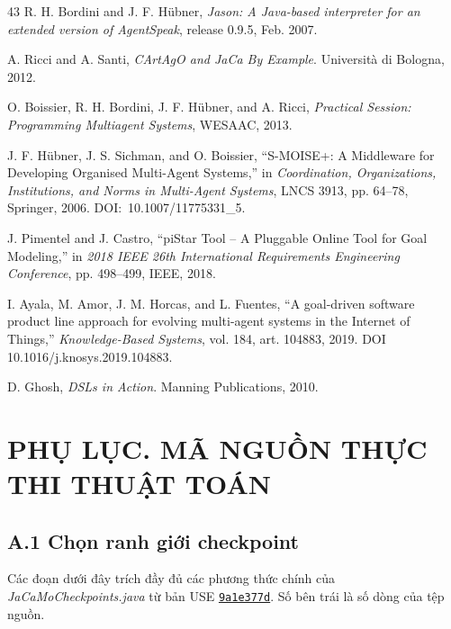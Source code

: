 \documentclass[12pt,a4paper,oneside]{extreport}
\begin{document}
\begin{thebibliography}{43}
R. H. Bordini and J. F. Hübner, \emph{Jason: A Java-based interpreter for an extended version of AgentSpeak}, release 0.9.5, Feb. 2007.


A. Ricci and A. Santi, \emph{CArtAgO and JaCa By Example}. Università di Bologna, 2012.


O. Boissier, R. H. Bordini, J. F. Hübner, and A. Ricci, \emph{Practical Session: Programming Multiagent Systems}, WESAAC, 2013.


J. F. Hübner, J. S. Sichman, and O. Boissier, ``S-MOISE+: A Middleware for Developing Organised Multi-Agent Systems,'' in \emph{Coordination, Organizations, Institutions, and Norms in Multi-Agent Systems}, LNCS 3913, pp. 64--78, Springer, 2006. \mbox{DOI: 10.1007/11775331\_5}.


J. Pimentel and J. Castro, ``piStar Tool -- A Pluggable Online Tool for Goal Modeling,'' in \emph{2018 IEEE 26th International Requirements Engineering Conference}, pp. 498--499, IEEE, 2018.


I. Ayala, M. Amor, J. M. Horcas, and L. Fuentes, ``A goal-driven software product line approach for evolving multi-agent systems in the Internet of Things,'' \emph{Knowledge-Based Systems}, vol. 184, art. 104883, 2019. DOI 10.1016/j.knosys.2019.104883.


D. Ghosh, \emph{DSLs in Action}. Manning Publications, 2010.

\end{thebibliography}

\chapter*{PHỤ LỤC. MÃ NGUỒN THỰC THI THUẬT TOÁN}

\section*{A.1 Chọn ranh giới checkpoint}
\label{app:checkpoint-source}

Các đoạn dưới đây trích đầy đủ các phương thức chính của \textit{JaCaMoCheckpoints.java} từ bản USE \href{https://github.com/nguyentrungnghia1802/use/tree/9a1e377d9802587abe4299a4247ce03f943473a6}{\texttt{9a1e377d}}. Số bên trái là số dòng của tệp nguồn.
\end{document}
